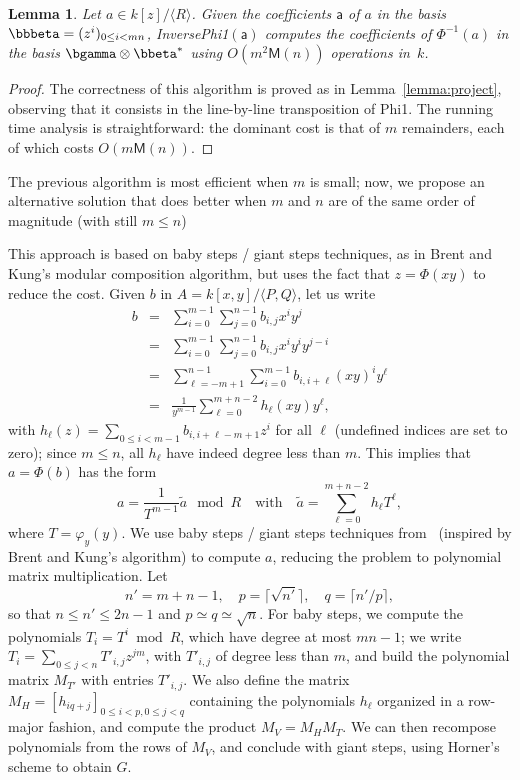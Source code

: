 \documentclass{sig-alternate}
\def\M {\ensuremath{\mathsf{M}}}
\def\va {\ensuremath{\mathsf{a}}}
\newcounter{algo}
\newcommand{\ang}[1]{\langle#1\rangle}
\newtheorem{Lemma}{Lemma}
\begin{document}
\begin{Lemma}
   Let $a\in k[z]/\ang{R}$. Given the coefficients $\va$ of $a$ in the
  basis $\bbbeta=(z^i)_{0 \le i < mn}$, {\em InversePhi1}$(\va)$
  computes the coefficients of $\Phi^{-1}(a)$ in the basis $\bgamma
  \otimes \bbeta^\ast$ using $O(m^2\M(n))$ operations in~$k$.
\end{Lemma}
\begin{proof}
  The correctness of this algorithm is proved as in
  Lemma~\ref{lemma:project}, observing that it consists in the
  line-by-line transposition of Phi1. The running time analysis is
  straightforward: the dominant cost is that of $m$ remainders, each
  of which costs $O(m\M(n))$.
\end{proof}

  The previous
algorithm is most efficient when $m$ is small; now, we propose an
alternative solution that does better when $m$ and $n$ are of the same
order of magnitude (with still $m \le n$)

This approach is based on baby steps / giant steps techniques, as in
Brent and Kung's modular composition algorithm, but uses the fact that
$z=\Phi(xy)$ to reduce the cost. Given $b$ in $A=k[x,y]/\ang{P,Q}$,
let us write
\begin{eqnarray*}
b&=&\sum_{i=0}^{m-1}\sum_{j=0}^{n-1} b_{i,j}x^i y^j\\
&=&\sum_{i=0}^{m-1}\sum_{j=0}^{n-1} b_{i,j}x^i y^i y^{j-i}\\
&=&\sum_{\ell=-m+1}^{n-1}\sum_{i=0}^{m-1} b_{i,i+\ell}(xy)^i y^\ell\\
&=&\frac{1}{y^{m-1}} \sum_{\ell=0}^{m+n-2} h_\ell(xy) y^\ell,
\end{eqnarray*}
with $h_\ell(z)=\sum_{0 \le i < m-1} b_{i,i+\ell-m+1} z^i$ for all
$\ell$ (undefined indices are set to zero); since $m \le n$, all
$h_\ell$ have indeed degree less than $m$. This implies that
$a=\Phi(b)$ has the form
$$a = \frac{1}{T^{m-1}}\widetilde{a} \mod R\quad\text{with}\quad
\widetilde{a}=\sum_{\ell=0}^{m+n-2} h_\ell T^\ell,$$ where $T=\varphi_y(y)$.
We use baby steps / giant steps techniques from~\cite{LeMeSc13}
(inspired by Brent and Kung's algorithm) to compute $a$, reducing the
problem to polynomial matrix multiplication. Let
$$n'=m+n-1,\quad p=\lceil \sqrt {n'} \rceil,\quad q=\lceil
n'/p\rceil,$$ so that $n \le n' \le 2n-1$ and $p\simeq q \simeq
\sqrt{n}$.  For baby steps, we compute the polynomials $T_i=T^i \bmod
R$, which have degree at most $mn-1$; we write $T_i = \sum_{0 \le j <
  n} T'_{i,j} z^{jm}$, with $T'_{i,j}$ of degree less than $m$, and
build the polynomial matrix $M_{T'}$ with entries $T'_{i,j}$.  We also
define the matrix $M_H=[h_{iq+j}]_{0 \le i <p, 0 \le j < q}$
containing the polynomials $h_\ell$ organized in a row-major fashion, and
compute the product $M_V=M_H M_T$. We can then recompose polynomials
from the rows of $M_V$, and conclude with giant steps, using Horner's
scheme to obtain $G$.
\end{document}
